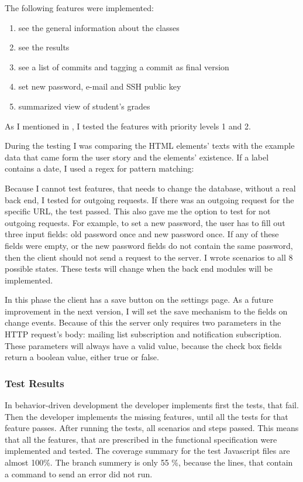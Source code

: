 
The following features were implemented:

\begin{enumerate}
	\item see the general information about the classes
	\setcounter{enumi}{0}
	\item see the results
	\item see a list of commits and tagging a commit as final version
	\setcounter{enumi}{1}
	\item set new password, e-mail and SSH public key
	\item summarized view of student's grades
\end{enumerate}

As I mentioned in , I tested the features with priority levels 1 and 2.

During the testing I was comparing the HTML elements' texts with the example data that came form the user story and the elements' existence. If a label contains a date, I used a regex for pattern matching:


Because I cannot test features, that needs to change the database, without a real back end, I tested for outgoing requests. If there was an outgoing request for the specific URL, the test passed. This  also gave me the option to test for not outgoing requests. For example, to set a new password, the user has to fill out three input fields: old password once and new password once. If any of these fields were empty, or the new password fields do not contain the same password, then the client should not send a request to the server. I wrote scenarios to all 8 possible states. These tests will change when the back end modules will be implemented.

In this phase the client has a save button on the settings page. As a future improvement in the next version, I will set the save mechanism to the fields on change events. Because of this the server only requires two parameters in the HTTP request's body: mailing list subscription and notification subscription. These parameters will always have a valid value, because the check box fields return a boolean value, either true or false.

\subsubsection{Test Results}
In behavior-driven development the developer implements first the tests, that fail. Then the developer implements the missing features, until all the tests for that feature passes. After running the tests, all scenarios and steps passed. This means that all the features, that are prescribed in the functional specification were implemented and tested. The coverage summary for the test Javascript files are almost 100\%. The branch summery is only 55 \%, because the lines, that contain a command to send an error did not run.

